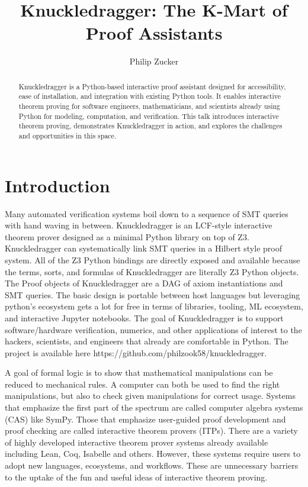 \documentclass{article}%
\begin{document}
\title{Knuckledragger: The K-Mart of Proof Assistants}


\author{Philip Zucker}

\maketitle
\begin{abstract}
Knuckledragger is a Python-based interactive proof assistant designed for accessibility, ease of installation, and integration with existing Python tools. It enables interactive theorem proving for software engineers, mathematicians, and scientists already using Python for modeling, computation, and verification. This talk introduces interactive theorem proving, demonstrates Knuckledragger in action, and explores the challenges and opportunities in this space.
\end{abstract}


\section{Introduction}

Many automated verification systems boil down to a sequence of SMT
queries with hand waving in between. Knuckledragger is an LCF-style
interactive theorem prover designed as a minimal Python library on top
of Z3. Knuckledragger can systematically link SMT queries in a Hilbert
style proof system. All of the Z3 Python bindings are directly exposed
and available because the terms, sorts, and formulas of Knuckledragger
are literally Z3 Python objects. The Proof objects of Knuckledragger
are a DAG of axiom instantiations and SMT queries. The basic design is
portable between host languages but leveraging python's ecosystem gets
a lot for free in terms of libraries, tooling, ML ecosystem, and
interactive Jupyter notebooks. The goal of Knuckledragger is to
support software/hardware verification, numerics, and other
applications of interest to the hackers, scientists, and engineers
that already are comfortable in Python. The project is available here
https://github.com/philzook58/knuckledragger.

A goal of formal logic is to show that mathematical manipulations can be reduced to mechanical rules. A computer can both be used to find the right manipulations, but also to check given manipulations for correct usage. Systems that emphasize the first part of the spectrum are called computer algebra systems (CAS) like SymPy. Those that emphasize user-guided proof development and proof checking are called interactive theorem provers (ITPs). There are a variety of highly developed interactive theorem prover systems already available including Lean, Coq, Isabelle and others. However, these systems require users to adopt new languages, ecosystems, and workflows. These are unnecessary barriers to the uptake of the fun and useful ideas of interactive theorem proving.
\end{document}
